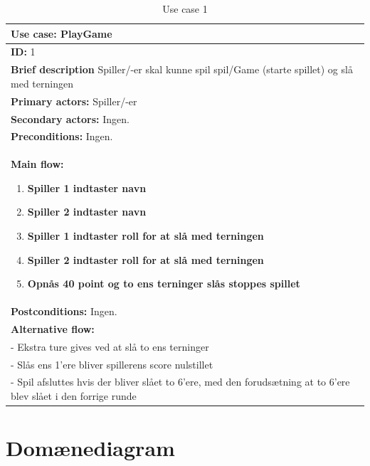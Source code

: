 \begin{table}[H]
    \begin{center}
        \begin{tabular}{ | p{15cm} |}
            \hline
            \textbf{Use case:} PlayGame \\ \hline
            \textbf{ID:} 1 \\ \hline
            \textbf{Brief description} Spiller/-er skal kunne spil spil/Game (starte spillet) og slå med terningen     \\ \hline
            \textbf{Primary actors:} Spiller/-er \\ \hline
            \textbf{Secondary actors:} Ingen. \\ \hline
            \textbf{Preconditions:} Ingen.     \\ \hline
            \textbf{Main flow:}
            \begin{enumerate}
                \item \textbf{Spiller 1 indtaster navn}
                \item \textbf{Spiller 2 indtaster navn}
                \item \textbf{Spiller 1 indtaster roll for at slå med terningen}
                \item \textbf{Spiller 2 indtaster roll for at slå med terningen}
                \item \textbf{Opnås 40 point og to ens terninger slås stoppes spillet}    
            \end{enumerate} \\ \hline
            \textbf{Postconditions:} Ingen.\\ \hline
            \textbf{Alternative flow:}
            \\- Ekstra ture gives ved at slå to ens terninger
            \\- Slås ens 1’ere bliver spillerens score nulstillet
            \\- Spil afsluttes hvis der bliver slået to 6’ere, med den forudsætning at to 6’ere blev slået i den forrige runde  \\ \hline
            \hline
        \end{tabular}
        \caption{Use case 1}
        \label{usecase:1}
    \end{center}
\end{table}

\newpage

\section{Domænediagram}

